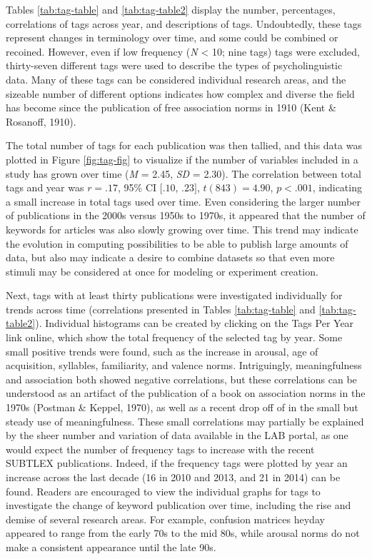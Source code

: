 \documentclass[english,,man]{apa6}
\theoremstyle{definition}
\theoremstyle{definition}
\theoremstyle{definition}
\theoremstyle{remark}
\begin{document}
Tables \ref{tab:tag-table} and \ref{tab:tag-table2} display the number,
percentages, correlations of tags across year, and descriptions of tags.
Undoubtedly, these tags represent changes in terminology over time, and
some could be combined or recoined. However, even if low frequency
(\emph{N} \textless{} 10; nine tags) tags were excluded, thirty-seven
different tags were used to describe the types of psycholinguistic data.
Many of these tags can be considered individual research areas, and the
sizeable number of different options indicates how complex and diverse
the field has become since the publication of free association norms in
1910 (Kent \& Rosanoff, 1910).

The total number of tags for each publication was then tallied, and this
data was plotted in Figure \ref{fig:tag-fig} to visualize if the number
of variables included in a study has grown over time (\emph{M} = 2.45,
\emph{SD} = 2.30). The correlation between total tags and year was
\(r = .17\), 95\% CI \([.10\), \(.23]\), \(t(843) = 4.90\),
\(p < .001\), indicating a small increase in total tags used over time.
Even considering the larger number of publications in the 2000s versus
1950s to 1970s, it appeared that the number of keywords for articles was
also slowly growing over time. This trend may indicate the evolution in
computing possibilities to be able to publish large amounts of data, but
also may indicate a desire to combine datasets so that even more stimuli
may be considered at once for modeling or experiment creation.

Next, tags with at least thirty publications were investigated
individually for trends across time (correlations presented in Tables
\ref{tab:tag-table} and \ref{tab:tag-table2}). Individual histograms can
be created by clicking on the Tags Per Year link online, which show the
total frequency of the selected tag by year. Some small positive trends
were found, such as the increase in arousal, age of acquisition,
syllables, familiarity, and valence norms. Intriguingly, meaningfulness
and association both showed negative correlations, but these
correlations can be understood as an artifact of the publication of a
book on association norms in the 1970s (Postman \& Keppel, 1970), as
well as a recent drop off of in the small but steady use of
meaningfulness. These small correlations may partially be explained by
the sheer number and variation of data available in the LAB portal, as
one would expect the number of frequency tags to increase with the
recent SUBTLEX publications. Indeed, if the frequency tags were plotted
by year an increase across the last decade (16 in 2010 and 2013, and 21
in 2014) can be found. Readers are encouraged to view the individual
graphs for tags to investigate the change of keyword publication over
time, including the rise and demise of several research areas. For
example, confusion matrices heyday appeared to range from the early 70s
to the mid 80s, while arousal norms do not make a consistent appearance
until the late 90s.
\end{document}
